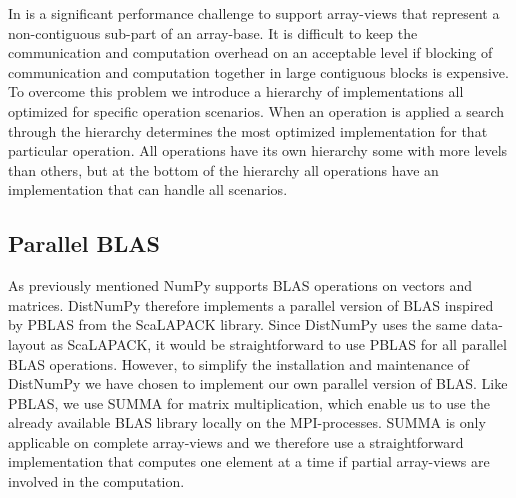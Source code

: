 \documentclass[10pt]{article}
\begin{document}

In is a significant performance challenge to support array-views that represent a non-contiguous sub-part of an array-base. It is difficult to keep the communication and computation overhead on an acceptable level if blocking of communication and computation together in large contiguous blocks is expensive. To overcome this problem we introduce a hierarchy of implementations all optimized for specific operation scenarios. When an operation is applied a search through the hierarchy determines the most optimized implementation for that particular operation. All operations have its own hierarchy some with more levels than others, but at the bottom of the hierarchy all operations have an implementation that can handle all scenarios.


\subsection{Parallel BLAS}
As previously mentioned NumPy supports BLAS operations on vectors and matrices. DistNumPy therefore implements a parallel version of BLAS inspired by PBLAS from the ScaLAPACK library. Since DistNumPy uses the same data-layout as ScaLAPACK, it would be straightforward to use PBLAS for all parallel BLAS operations. However, to simplify the installation and maintenance of DistNumPy we have chosen to implement our own parallel version of BLAS. Like PBLAS, we use SUMMA\cite{SUMMA_GeijnW97} for matrix multiplication, which enable us to use the already available BLAS library locally on the MPI-processes. SUMMA is only applicable on complete array-views and we therefore use a straightforward implementation that computes one element at a time if partial array-views are involved in the computation. 
\end{document}
